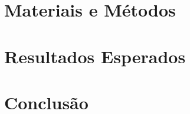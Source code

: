 \documentclass[twocolumn, 9pt]{article}
\begin{document}
\section{Materiais e Métodos}


\section{Resultados Esperados}


\section{Conclusão}


 

\end{document}
